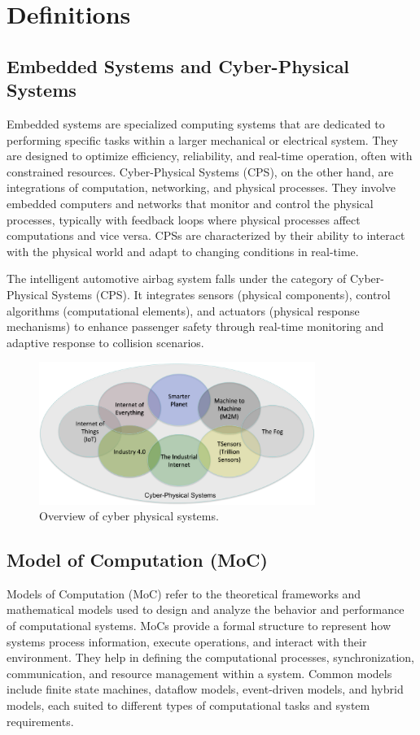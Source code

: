 \documentclass[12pt	]{article}
\begin{document}
\section{Definitions}
\subsection{Embedded Systems and Cyber-Physical Systems}
Embedded systems are specialized computing systems that are dedicated to performing specific tasks within a larger mechanical or electrical system. They are designed to optimize efficiency, reliability, and real-time operation, often with constrained resources. Cyber-Physical Systems (CPS), on the other hand, are integrations of computation, networking, and physical processes. They involve embedded computers and networks that monitor and control the physical processes, typically with feedback loops where physical processes affect computations and vice versa. CPSs are characterized by their ability to interact with the physical world and adapt to changing conditions in real-time.

The intelligent automotive airbag system falls under the category of Cyber-Physical Systems (CPS). It integrates sensors (physical components), control algorithms (computational elements), and actuators (physical response mechanisms) to enhance passenger safety through real-time monitoring and adaptive response to collision scenarios.

\begin{figure}[h]
	\centering
	\includegraphics[width=0.8\textwidth]{Images/img6.png}
	\caption{Overview of cyber physical systems.}
	\label{fig:Overview of cyber physical systems}
\end{figure}





\subsection{Model of Computation (MoC)}
Models of Computation (MoC) refer to the theoretical frameworks and mathematical models used to design and analyze the behavior and performance of computational systems. MoCs provide a formal structure to represent how systems process information, execute operations, and interact with their environment. They help in defining the computational processes, synchronization, communication, and resource management within a system. Common models include finite state machines, dataflow models, event-driven models, and hybrid models, each suited to different types of computational tasks and system requirements.
\end{document}
